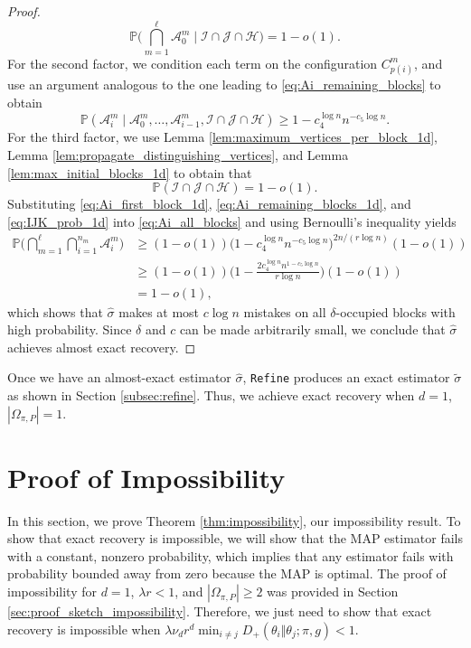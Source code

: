 \documentclass{article}
\renewcommand{\P}{\mathbb{P}}
\newcommand{\1}{\mathbbm{1}}
\newcommand{\calA}{\mathcal{A}}
\newcommand{\calH}{\mathcal{H}}
\newcommand{\calI}{\mathcal{I}}
\newcommand{\calJ}{\mathcal{J}}
\theoremstyle{definition}
\theoremstyle{plain}
\begin{document}
\begin{proof}
\begin{equation}
    \P\bigg(\bigcap_{m=1}^\ell \calA_0^m \mid \calI \cap \calJ \cap \calH\bigg) = 1 - o(1).
\end{equation}
For the second factor, we condition each term on the configuration $C_{p(i)}^m$, and use an argument analogous to the one leading to \eqref{eq:Ai_remaining_blocks} to obtain
\begin{equation}
\label{eq:Ai_remaining_blocks_1d}
    \P(\calA_i^m \mid \calA_0^m, \ldots, \calA_{i-1}^m, \calI \cap \calJ \cap \calH) \geq 1 - c_4^{\log n} n^{-c_5 \log n}.
\end{equation}
For the third factor, we use Lemma \ref{lem:maximum_vertices_per_block_1d}, Lemma \ref{lem:propagate_distinguishing_vertices}, and Lemma \ref{lem:max_initial_blocks_1d} to obtain that
\begin{equation}
\label{eq:IJK_prob_1d}
    \P(\calI \cap \calJ \cap \calH) = 1 - o(1).
\end{equation}
Substituting \eqref{eq:Ai_first_block_1d}, \eqref{eq:Ai_remaining_blocks_1d}, and \eqref{eq:IJK_prob_1d} into \eqref{eq:Ai_all_blocks} and using Bernoulli's inequality yields
\begin{align*}
    \P\bigg(\bigcap_{m=1}^\ell \bigcap_{i=1}^{n_m} \calA_i^m\bigg) &\geq (1 - o(1))\Big(1 - c_4^{\log n} n^{-c_5 \log n}\Big)^{2n/(r \log n)} (1 - o(1)) \\
    &\geq (1 - o(1))\bigg(1 - \frac{2 c_4^{\log n} n^{1 - c_5 \log n}}{r \log n} \bigg) (1 - o(1)) \\
    &= 1 - o(1),
\end{align*}
which shows that $\hat{\sigma}$ makes at most $c \log n$ mistakes on all $\delta$-occupied blocks with high probability. Since $\delta$ and $c$ can be made arbitrarily small, we conclude that $\hat{\sigma}$ achieves almost exact recovery.
\end{proof}

Once we have an almost-exact estimator $\hat{\sigma}$, \texttt{Refine} produces an exact estimator $\tilde{\sigma}$ as shown in Section \ref{subsec:refine}. Thus, we achieve exact recovery when $d = 1$, $| \Omega_{\pi, P}| = 1$.







\section{Proof of Impossibility}
\label{appx:proof_of_impossibility}
In this section, we prove Theorem \ref{thm:impossibility}, our impossibility result. To show that exact recovery is impossible, we will show that the MAP estimator fails with a constant, nonzero probability, which implies that any estimator fails with probability bounded away from zero because the MAP is optimal. The proof of impossibility for $d=1$, $\lambda r < 1$, and $|\Omega_{\pi, P}| \geq 2$ was provided in Section \ref{sec:proof_sketch_impossibility}. Therefore, we just need to show that exact recovery is impossible when $\lambda \nu_d r^d \min_{i \neq j} D_+(\theta_i \Vert \theta_j; \pi, g) < 1$.
\end{document}
